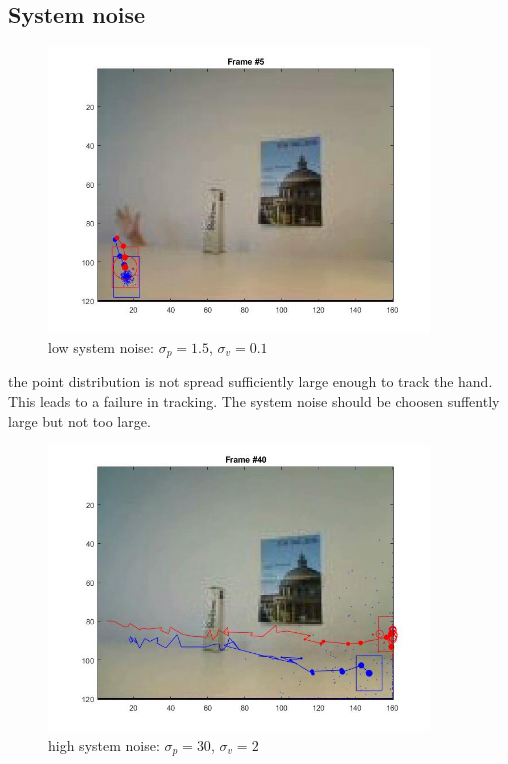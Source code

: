 \documentclass[12pt]{article}
\begin{document}
\subsection{System noise}
\vspace{5mm}
\begin{figure}[H]
	\centering
	\includegraphics[width=0.9\textwidth]{low_noise.jpg}
	\caption{low system noise: $\sigma_p = 1.5$, $\sigma_v = 0.1$}
	\label{fig1}
\end{figure}
\vspace{5mm}
the point distribution is not spread sufficiently large enough to track the hand. This leads to a failure in tracking. The system noise should be choosen suffently large but not too large. 
\vspace{5mm}
\begin{figure}[H]
	\centering
	\includegraphics[width=0.9\textwidth]{high_noise.jpg}
	\caption{high system noise: $\sigma_p = 30$, $\sigma_v = 2$}
	\label{fig1}
\end{figure}
\end{document}
